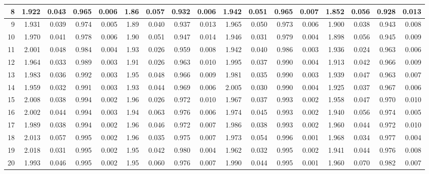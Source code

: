 \documentclass[
]{article}
\begin{document}
\begin{table}[H]
{\begin{tabular}{r|r|r|r|r|r|r|r|r|r|r|r|r|r|r|r|r}
\hline
8 & 1.922 & 0.043 & 0.965 & 0.006 & 1.86 & 0.057 & 0.932 & 0.006 & 1.942 & 0.051 & 0.965 & 0.007 & 1.852 & 0.056 & 0.928 & 0.013\\
\hline
9 & 1.931 & 0.039 & 0.974 & 0.005 & 1.89 & 0.040 & 0.937 & 0.013 & 1.965 & 0.050 & 0.973 & 0.006 & 1.900 & 0.038 & 0.943 & 0.008\\
\hline
10 & 1.970 & 0.041 & 0.978 & 0.006 & 1.90 & 0.051 & 0.947 & 0.014 & 1.946 & 0.031 & 0.979 & 0.004 & 1.898 & 0.056 & 0.945 & 0.009\\
\hline
11 & 2.001 & 0.048 & 0.984 & 0.004 & 1.93 & 0.026 & 0.959 & 0.008 & 1.942 & 0.040 & 0.986 & 0.003 & 1.936 & 0.024 & 0.963 & 0.006\\
\hline
12 & 1.964 & 0.033 & 0.989 & 0.003 & 1.91 & 0.026 & 0.963 & 0.010 & 1.995 & 0.037 & 0.990 & 0.004 & 1.913 & 0.042 & 0.966 & 0.009\\
\hline
13 & 1.983 & 0.036 & 0.992 & 0.003 & 1.95 & 0.048 & 0.966 & 0.009 & 1.981 & 0.035 & 0.990 & 0.003 & 1.939 & 0.047 & 0.963 & 0.007\\
\hline
14 & 1.959 & 0.032 & 0.991 & 0.003 & 1.93 & 0.044 & 0.969 & 0.006 & 2.005 & 0.030 & 0.990 & 0.004 & 1.925 & 0.037 & 0.967 & 0.006\\
\hline
15 & 2.008 & 0.038 & 0.994 & 0.002 & 1.96 & 0.026 & 0.972 & 0.010 & 1.967 & 0.037 & 0.993 & 0.002 & 1.958 & 0.047 & 0.970 & 0.010\\
\hline
16 & 2.002 & 0.044 & 0.994 & 0.003 & 1.94 & 0.063 & 0.976 & 0.006 & 1.974 & 0.045 & 0.993 & 0.002 & 1.940 & 0.056 & 0.974 & 0.005\\
\hline
17 & 1.989 & 0.038 & 0.994 & 0.002 & 1.96 & 0.046 & 0.972 & 0.007 & 1.986 & 0.038 & 0.993 & 0.002 & 1.960 & 0.044 & 0.972 & 0.010\\
\hline
18 & 2.013 & 0.057 & 0.995 & 0.002 & 1.96 & 0.035 & 0.975 & 0.007 & 1.973 & 0.054 & 0.996 & 0.001 & 1.968 & 0.034 & 0.977 & 0.004\\
\hline
19 & 2.018 & 0.031 & 0.995 & 0.002 & 1.95 & 0.042 & 0.980 & 0.004 & 1.962 & 0.032 & 0.995 & 0.002 & 1.941 & 0.044 & 0.976 & 0.008\\
\hline
20 & 1.993 & 0.046 & 0.995 & 0.002 & 1.95 & 0.060 & 0.976 & 0.007 & 1.990 & 0.044 & 0.995 & 0.001 & 1.960 & 0.070 & 0.982 & 0.007\\
\hline
\end{tabular}}\begin{table}
\centering
{}
\end{table}
\end{table}
\end{document}
